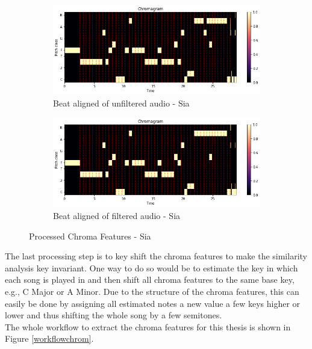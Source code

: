 \begin{figure}[htbp]
{{			\begin{subfigure}{.495\textwidth}
				\centering    
				\includegraphics[scale=0.3]{Images/Chroma/siaunfiltered.png}
				\caption{Beat aligned of unfiltered audio - Sia}
				\label{siaub}
			\end{subfigure}
			\begin{subfigure}{.495\textwidth}
				\centering     
				\includegraphics[scale=0.3]{Images/Chroma/siafiltered.png}
				\caption{Beat aligned of filtered audio - Sia}
				\label{siafb}
			\end{subfigure}%
	}}
	\caption{Processed Chroma Features - Sia}
	\label{beataligned}
\end{figure}
The last processing step is to key shift the chroma features to make the similarity analysis key invariant. One way to do so would be to estimate the key in which each song is played in and then shift all chroma features to the same base key, e.g., C Major or A Minor. Due to the structure of the chroma features, this can easily be done by assigning all estimated notes a new value a few keys higher or lower and thus shifting the whole song by a few semitones.\\
The whole workflow to extract the chroma features for this thesis is shown in Figure \ref{workflowchrom}.\\
\begin{figure}[htbp]
	\centering
\end{figure}
